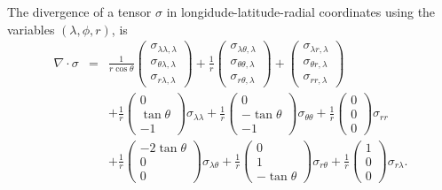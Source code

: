 \documentclass[11pt]{report}
\begin{document}
The divergence of a tensor $\sigma$ in longidude-latitude-radial coordinates using the variables $(\lambda, \phi, r)$, is 
\begin{eqnarray}
\nabla\cdot\sigma
&=& \frac{1}{r\cos\theta} \left( \begin{array}{c} \sigma_{\lambda\lambda,\lambda} \\ \sigma_{\theta\lambda,\lambda} \\ \sigma_{r\lambda,\lambda} \end{array} \right)
+ \frac{1}{r}       \left( \begin{array}{c} \sigma_{\lambda\theta,\lambda} \\ \sigma_{\theta\theta,\lambda} \\ \sigma_{r\theta,\lambda} \end{array} \right)
+                   \left( \begin{array}{c} \sigma_{\lambda r,\lambda} \\ \sigma_{\theta r,\lambda} \\ \sigma_{rr,\lambda} \end{array} \right) 
\\ && 
+ \frac{1}{r}       \left( \begin{array}{c} 0 \\ \tan\theta \\ -1 \end{array} \right) \sigma_{\lambda\lambda} 
+ \frac{1}{r}       \left( \begin{array}{c} 0 \\ -\tan\theta \\ -1 \end{array} \right) \sigma_{\theta\theta} 
+ \frac{1}{r}       \left( \begin{array}{c} 0 \\ 0 \\ 0 \end{array} \right) \sigma_{r r} 
\\ &&
+ \frac{1}{r}       \left( \begin{array}{c} -2\tan\theta \\ 0 \\ 0 \end{array} \right) \sigma_{\lambda\theta} 
+ \frac{1}{r}       \left( \begin{array}{c} 0 \\ 1 \\ -\tan\theta \end{array} \right) \sigma_{r\theta} 
+ \frac{1}{r}       \left( \begin{array}{c} 1 \\ 0 \\ 0 \end{array} \right) \sigma_{r\lambda}.
\end{eqnarray}
\end{document}
